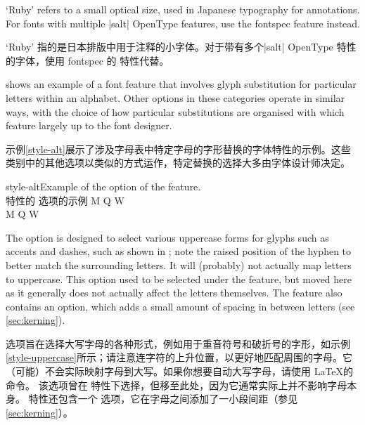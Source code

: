 \documentclass[a4paper]{l3doc}
\begin{document}
`Ruby' refers to a small optical size, used in
Japanese typography for annotations.
For fonts with multiple |salt| OpenType features,
use the fontspec  feature instead.

`Ruby' 指的是日本排版中用于注释的小字体。对于带有多个|salt| OpenType 特性的字体，使用 fontspec 的  特性代替。

 shows an example of a font feature that involves glyph substitution
for particular letters within an alphabet.
Other options in these categories operate in similar ways, with the choice of how
particular substitutions are organised with which feature largely up to the font designer.

示例\ref{style-alt}展示了涉及字母表中特定字母的字形替换的字体特性的示例。这些类别中的其他选项以类似的方式运作，特定替换的选择大多由字体设计师决定。

 \begin{Xexample}[firstline=2]{style-alt}{Example of the  option of the  feature.\\特性的  选项的示例}
  \Large
   M Q W                      \\
   M Q W
\end{Xexample}

The  option is designed to select various
uppercase forms for glyphs such as accents and dashes, such as shown
in ; note the raised position of the hyphen
to better match the surrounding letters.
It will (probably) not actually map letters to uppercase.
This option used to be selected under the  feature, but moved here
as it generally does not actually affect the letters themselves.
The  feature also contains an  option,
which adds a small amount of spacing in between letters (see \vref{sec:kerning}).

 选项旨在选择大写字母的各种形式，例如用于重音符号和破折号的字形，如示例\ref{style-uppercase}所示；请注意连字符的上升位置，以更好地匹配周围的字母。它（可能）不会实际映射字母到大写。如果你想要自动大写字母，请使用 \LaTeX 的 \cmd\MakeUppercase 命令。
该选项曾在  特性下选择，但移至此处，因为它通常实际上并不影响字母本身。  特性还包含一个  选项，它在字母之间添加了一小段间距（参见\vref{sec:kerning}）。
\end{document}
